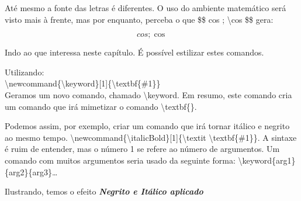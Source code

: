 Até mesmo a fonte das letras é diferentes.
O uso do ambiente matemático será visto mais à frente, mas por enquanto, perceba o que \$\$ cos ; \textbackslash cos \$\$ gera:

$$cos ; \cos$$

Indo ao que interessa neste capítulo.
É possível estilizar estes comandos.

Utilizando:\\
\indent \textbackslash newcommand\{\textbackslash keyword\}[1]\{\textbackslash textbf\{\#1\}\}\\
\indent Geramos um novo comando, chamado \textbackslash keyword.
Em resumo, este comando cria um comando que irá mimetizar o comando \textbackslash textbf\{\}.

Podemos assim, por exemplo, criar um comando que irá tornar itálico e negrito ao mesmo tempo.
\textbackslash newcommand\{\textbackslash italicBold\}[1]\{\textbackslash textit \textbackslash textbf\{\#1\}\}.
A sintaxe é ruim de entender, mas o número 1 se refere ao número de argumentos.
Um comando com muitos argumentos seria usado da seguinte forma: \textbackslash keyword\{arg1\}\{arg2\}\{arg3\}\ldots

\newcommand{\italicBold}[1]{\textit{\textbf{#1}}}
Ilustrando, temos o efeito \italicBold{Negrito e Itálico aplicado}

\newpage
